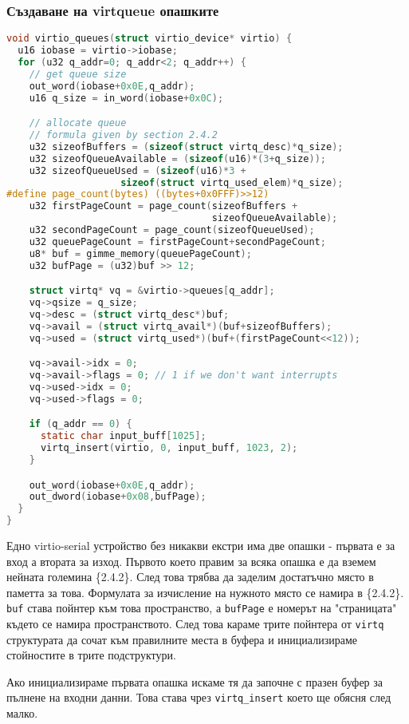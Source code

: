 \subsubsection{Създаване на virtqueue опашките}
\begin{lstlisting}[language=C]
void virtio_queues(struct virtio_device* virtio) {
  u16 iobase = virtio->iobase;
  for (u32 q_addr=0; q_addr<2; q_addr++) {
    // get queue size
    out_word(iobase+0x0E,q_addr);
    u16 q_size = in_word(iobase+0x0C);

    // allocate queue
    // formula given by section 2.4.2
    u32 sizeofBuffers = (sizeof(struct virtq_desc)*q_size);
    u32 sizeofQueueAvailable = (sizeof(u16)*(3+q_size));
    u32 sizeofQueueUsed = (sizeof(u16)*3 +
                    sizeof(struct virtq_used_elem)*q_size);
#define page_count(bytes) ((bytes+0x0FFF)>>12)
    u32 firstPageCount = page_count(sizeofBuffers +
                                    sizeofQueueAvailable);
    u32 secondPageCount = page_count(sizeofQueueUsed);
    u32 queuePageCount = firstPageCount+secondPageCount;
    u8* buf = gimme_memory(queuePageCount);
    u32 bufPage = (u32)buf >> 12;

    struct virtq* vq = &virtio->queues[q_addr];
    vq->qsize = q_size;
    vq->desc = (struct virtq_desc*)buf;
    vq->avail = (struct virtq_avail*)(buf+sizeofBuffers);
    vq->used = (struct virtq_used*)(buf+(firstPageCount<<12));

    vq->avail->idx = 0;
    vq->avail->flags = 0; // 1 if we don't want interrupts
    vq->used->idx = 0;
    vq->used->flags = 0;

    if (q_addr == 0) {
      static char input_buff[1025];
      virtq_insert(virtio, 0, input_buff, 1023, 2);
    }

    out_word(iobase+0x0E,q_addr);
    out_dword(iobase+0x08,bufPage);
  }
}
\end{lstlisting}
Едно virtio-serial устройство без никакви екстри има две опашки - първата е за вход а втората за изход. Първото което правим за всяка опашка е да вземем нейната големина \{2.4.2\}. След това трябва да заделим достатъчно място в паметта за това. Формулата за изчисление на нужното място се намира в \{2.4.2\}. {\tt buf} става пойнтер към това пространство, а {\tt bufPage} е номерът на "страницата" където се намира пространството.
След това караме трите пойнтера от {\tt virtq} структурата да сочат към правилните места в буфера и инициализираме стойностите в трите подструктури.

Ако инициализираме първата опашка искаме тя да започне с празен буфер за пълнене на входни данни. Това става чрез {\tt virtq\_insert} което ще обясня след малко.


